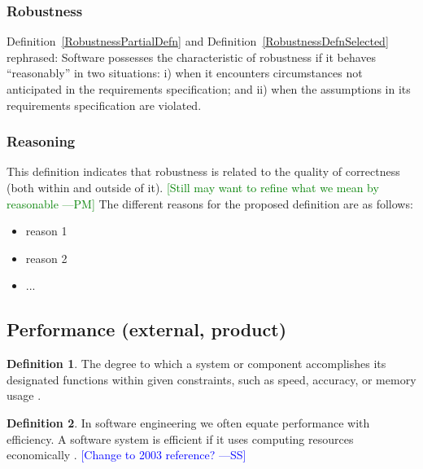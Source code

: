 \documentclass[letterpaper, cleveref]{lipics-v2019}
\newcommand{\authornote}[3]{\textcolor{#1}{[#3 ---#2]}}
\newcommand{\authornote}[3]{}
\newcommand{\wss}[1]{\authornote{blue}{SS}{#1}} %
\newcommand{\pmi}[1]{\authornote{green}{PM}{#1}} %
\theoremstyle{definition}
\newtheorem{defn}{Definition}
\begin{document}
\begin{mybox}
\subsubsection*{Robustness}
Definition~\ref{RobustnessPartialDefn} and
Definition~\ref{RobustnessDefnSelected} rephrased: Software possesses the
characteristic of robustness if it behaves ``reasonably'' in two situations: i)
when it encounters circumstances not anticipated in the requirements
specification; and ii) when the assumptions in its requirements specification
are violated.
\end{mybox}

\subsubsection*{Reasoning}

This definition indicates that robustness is related to the quality of
correctness (both within and outside of it). \pmi{Still may want to refine what
we mean by reasonable}  The different reasons for the proposed definition are as
follows:

\begin{itemize}
  \item reason 1
  \item reason 2
  \item ...
\end{itemize}


\subsection{Performance (external, product)} %

\begin{defn} \label{PerformanceDefnSelected}
  The degree to which a system or component accomplishes its designated
  functions within given constraints, such as speed, accuracy, or memory
  usage \citep{IEEEStdGlossarySET1990}.
\end{defn}

\begin{defn}
	In software engineering we often equate performance with efficiency. A
  software system is efficient if it uses computing resources economically
  \citep{ghezzi1991fundamentals}.  \wss{Change to 2003 reference?}
\end{defn}
\end{document}

